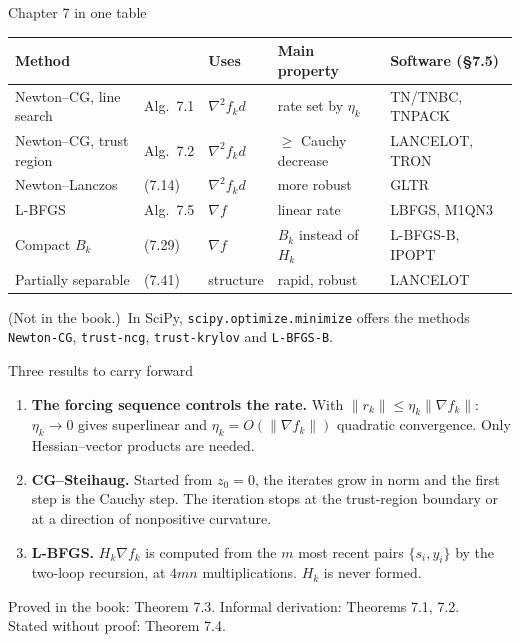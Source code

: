 \documentclass[aspectratio=169,12pt]{beamer}
\newcommand{\gradf}{\nabla f}
\newcommand{\hessf}{\nabla^{2} f}
\newcommand{\notinbook}{{\small(Not in the book.)}}
\begin{document}
\begin{frame}{Chapter 7 in one table}
  \begin{center}
  \small\setlength\tabcolsep{3.5pt}
  \begin{tabular}{lllll}
    \toprule
    Method & & Uses & Main property & Software (\S7.5) \\
    \midrule
    Newton--CG, line search & Alg.~7.1 & $\hessf_{k}d$ & rate set by $\eta_{k}$ & TN/TNBC, TNPACK \\
    Newton--CG, trust region & Alg.~7.2 & $\hessf_{k}d$ & $\ge$ Cauchy decrease & LANCELOT, TRON \\
    Newton--Lanczos & (7.14) & $\hessf_{k}d$ & more robust & GLTR \\
    L-BFGS & Alg.~7.5 & $\gradf$ & linear rate & LBFGS, M1QN3 \\
    Compact $B_{k}$ & (7.29) & $\gradf$ & $B_{k}$ instead of $H_{k}$ & L-BFGS-B, IPOPT \\
    Partially separable & (7.41) & structure & rapid, robust & LANCELOT \\
    \bottomrule
  \end{tabular}
  \end{center}

  \vspace{0.2em}
  \notinbook\ In SciPy, \texttt{scipy.optimize.minimize} offers the methods \texttt{Newton-CG},
  \texttt{trust-ncg}, \texttt{trust-krylov} and \texttt{L-BFGS-B}.
\end{frame}

\begin{frame}{Three results to carry forward}
  \begin{enumerate}\setlength\itemsep{0.6em}
    \item \textbf{The forcing sequence controls the rate.} With $\|r_{k}\|\le\eta_{k}\|\gradf_{k}\|$:
      $\eta_{k}\to 0$ gives superlinear and $\eta_{k}=O(\|\gradf_{k}\|)$ quadratic convergence. Only
      Hessian--vector products are needed.
    \item \textbf{CG--Steihaug.} Started from $z_{0}=0$, the iterates grow in norm and the first
      step is the Cauchy step. The iteration stops at the trust-region boundary or at a
      direction of nonpositive curvature.
    \item \textbf{L-BFGS.} $H_{k}\gradf_{k}$ is computed from the $m$ most recent pairs $\{s_{i},y_{i}\}$ by the
      two-loop recursion, at $4mn$ multiplications. $H_{k}$ is never formed.
  \end{enumerate}

  \vspace{0.6em}
  Proved in the book: Theorem 7.3. Informal derivation: Theorems 7.1, 7.2.\\
  Stated without proof: Theorem 7.4.
\end{frame}
\end{document}
